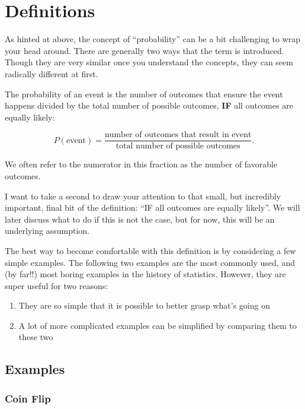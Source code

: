 \documentclass[]{book}
\providecommand{\tightlist}{%
  \setlength{\itemsep}{0pt}\setlength{\parskip}{0pt}}
\theoremstyle{definition}
\theoremstyle{definition}
\theoremstyle{definition}
\theoremstyle{remark}
\let\BeginKnitrBlock\begin \let\EndKnitrBlock\end
\begin{document}
\hypertarget{definitions}{%
\section{Definitions}\label{definitions}}

As hinted at above, the concept of ``probability'' can be a bit challenging to wrap your head around. There are generally two ways that the term is introduced. Though they are very similar once you understand the concepts, they can seem radically different at first.

\BeginKnitrBlock{definition}
\protect\hypertarget{def:prob-def-1}{}{\label{def:prob-def-1} }The probability of an event is the number of outcomes that ensure the event happens divided by the total number of possible outcomes, \textbf{IF} all outcomes are equally likely:

\[
  P(\text{event}) = \frac{\text{number of outcomes that result in event}}{\text{total number of possible outcomes}}.
\]
\EndKnitrBlock{definition}

We often refer to the numerator in this fraction as the number of favorable outcomes.

I want to take a second to draw your attention to that small, but incredibly important, final bit of the definition: ``IF all outcomes are equally likely''. We will later discuss what to do if this is not the case, but for now, this will be an underlying assumption.

The best way to become comfortable with this definition is by considering a few simple examples. The following two examples are the most commonly used, and (by far!!) most boring examples in the history of statistics. However, they are super useful for two reasons:

\begin{enumerate}
\def\labelenumi{\arabic{enumi}.}
\tightlist
\item
  They are so simple that it is possible to better grasp what's going on
\item
  A lot of more complicated examples can be simplified by comparing them to these two
\end{enumerate}

\hypertarget{examples-3}{%
\subsection{Examples}\label{examples-3}}

\hypertarget{coin-flip}{%
\subsubsection{Coin Flip}\label{coin-flip}}
\end{document}
